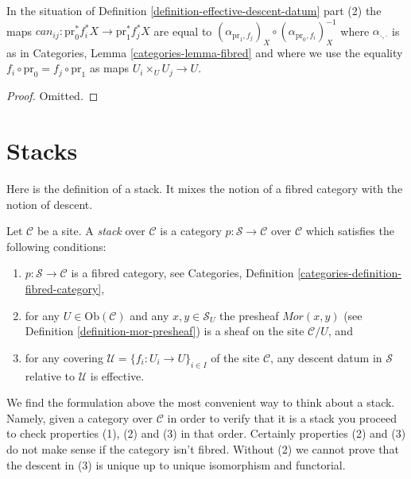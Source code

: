 \begin{lemma}
\label{lemma-trivial-cocycle}
In the situation of
Definition \ref{definition-effective-descent-datum} part (2) the maps
$can_{ij} : \text{pr}_0^*f_i^*X \to \text{pr}_1^*f_j^*X$ are equal to
$(\alpha_{\text{pr}_1, f_j})_X \circ (\alpha_{\text{pr}_0, f_i})_X^{-1}$
where $\alpha_{\cdot, \cdot}$ is as in
Categories, Lemma \ref{categories-lemma-fibred}
and where we
use the equality $f_i \circ \text{pr}_0 = f_j \circ \text{pr}_1$
as maps $U_i \times_U U_j \to U$.
\end{lemma}

\begin{proof}
Omitted.
\end{proof}












\section{Stacks}
\label{section-definition}

\noindent
Here is the definition of a stack. It mixes the notion of a fibred
category with the notion of descent.

\begin{definition}
\label{definition-stack}
Let $\mathcal{C}$ be a site. A {\it stack} over $\mathcal{C}$
is a category $p : \mathcal{S} \to \mathcal{C}$ over $\mathcal{C}$ which
satisfies the following conditions:
\begin{enumerate}
\item $p : \mathcal{S} \to \mathcal{C}$ is a fibred category, see
Categories, Definition \ref{categories-definition-fibred-category},
\item for any $U \in \text{Ob}(\mathcal{C})$ and any $x, y \in \mathcal{S}_U$
the presheaf $\mathit{Mor}(x, y)$ (see
Definition \ref{definition-mor-presheaf}) is a sheaf on
the site $\mathcal{C}/U$, and
\item for any covering $\mathcal{U} = \{f_i : U_i \to U\}_{i \in I}$
of the site $\mathcal{C}$, any descent datum in $\mathcal{S}$
relative to $\mathcal{U}$ is effective.
\end{enumerate}
\end{definition}

\noindent
We find the formulation above the most convenient way to think about
a stack. Namely, given a category over $\mathcal{C}$ in order to verify
that it is a stack you proceed to check properties (1), (2) and
(3) in that order. Certainly properties (2) and (3) do not make sense
if the category isn't fibred. Without (2) we cannot prove that the
descent in (3) is unique up to unique isomorphism and functorial.


